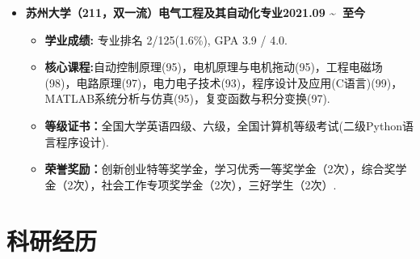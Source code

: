 \documentclass[UTF8,AutoFakeBold]{resume}
\begin{document}
\begin{itemize}
    \item
    {\large\kaishu\textbf{苏州大学（211，双一流）\hspace{3cm}电气工程及其自动化专业\hspace{2.5cm}2021.09 \textasciitilde \ 至今}}

    \begin{itemize}[nolistsep]
    \item[\faThumbTack]  \kaishu \textbf{学业成绩:} 专业排名 2/125(1.6\%), \qquad  GPA 3.9 / 4.0.
      \item[\faThumbTack] \kaishu\textbf{核心课程:}自动控制原理(95)，电机原理与电机拖动(95)，工程电磁场(98)，电路原理(97)，电力电子技术(93)，程序设计及应用(C语言)(99)，MATLAB系统分析与仿真(95)，复变函数与积分变换(97).
      \item[\faThumbTack] \kaishu\textbf{等级证书：}全国大学英语四级、六级，全国计算机等级考试(二级Python语言程序设计).
      \item[\faThumbTack] \kaishu\textbf{荣誉奖励：}创新创业特等奖学金，学习优秀一等奖学金（2次），综合奖学金（2次），社会工作专项奖学金（2次），三好学生（2次）.
    \end{itemize}
\end{itemize}

\vspace{0.1em}
\section{\hspace{0.25em}\makebox[0.75em][c]{\faFlask}\hspace{0.25em} \fangsong\textbf{科研经历}}
\vspace{0.1em}
\end{document}
